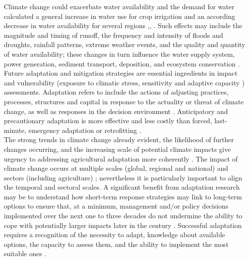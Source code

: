 \documentclass[letterpaper, 10 pt, conference]{ieeeconf}  %
\begin{document}
Climate change could exacerbate water availability and the demand for water calculated a general increase in water use for crop irrigation and an according decrease in water availability for several regions \cite{tekle2015assessment},\cite{tekle2015assessment}, \cite{riediger2016modelling}. Such effects may include the magnitude and timing of runoff, the frequency and intensity of floods and droughts, rainfall patterns, extreme weather events, and the quality and quantity of water availability; these changes in turn influence the water supply system, power generation, sediment transport, deposition, and ecosystem conservation \cite{tekle2015assessment}.\\

Future adaptation and mitigation strategies  \cite{jones2000analysing} are essential ingredients in impact and vulnerability (exposure to climatic stress, sensitivity and adaptive capacity \cite{de2017adaptability}) assessments. Adaptation refers to include the actions of adjusting practices, processes, structures and capital in response to the actuality or threat of climate change, as well as responses in the decision environment \cite{howden2007adapting}. Anticipatory and precautionary adaptation is more effective and less costly than forced, last-minute, emergency adaptation or retrofitting \cite{smit2003adaptation}.\\

The strong trends in climate change already evident, the likelihood of further changes occurring, and the increasing scale of potential climate impacts give urgency to addressing agricultural adaptation more coherently \cite{howden2007adapting}. The impact of climate change occurs at multiple scales (global, regional and national) and sectors (including agriculture) \cite{olayide2016differential}; nevertheless
it is particularly important to align the temporal and sectoral scales. A significant benefit from adaptation research may be to understand how short-term response strategies may link to long-term options to ensure that, at a minimum, management and/or policy decisions implemented over the next one to three decades do not undermine the ability to cope with potentially larger impacts later in the century \cite{howden2007adapting}. Successful adaptation requires a recognition of the necessity to adapt, knowledge about available options, the capacity to assess them, and the ability to implement the most suitable ones \cite{smit2003adaptation}. 
\end{document}
